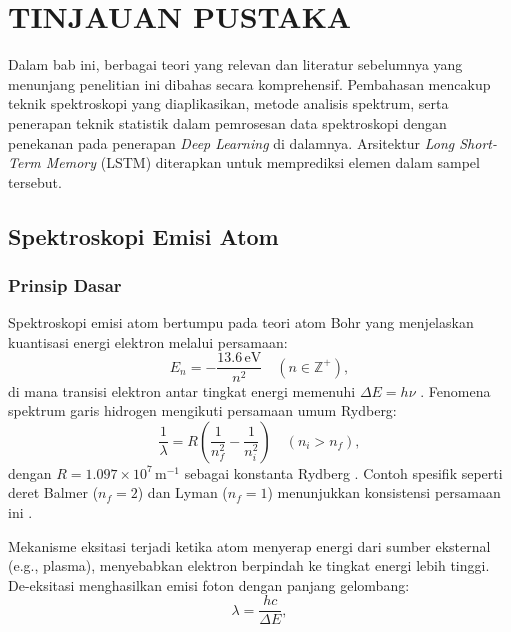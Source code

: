 


\chapter{TINJAUAN PUSTAKA}
\par Dalam bab ini, berbagai teori yang relevan dan literatur sebelumnya yang menunjang penelitian ini dibahas secara komprehensif. Pembahasan mencakup teknik spektroskopi yang diaplikasikan, metode analisis spektrum, serta penerapan teknik statistik dalam pemrosesan data spektroskopi dengan penekanan pada penerapan \textit{Deep Learning} di dalamnya. Arsitektur \textit{Long Short-Term Memory} (LSTM) diterapkan untuk memprediksi elemen dalam sampel tersebut.

\section{Spektroskopi Emisi Atom}
\subsection{Prinsip Dasar}
\label{subsec:prinsip-dasar}

Spektroskopi emisi atom bertumpu pada teori atom Bohr yang menjelaskan kuantisasi energi elektron melalui persamaan:
\begin{equation}
\label{eq:energi-bohr}
E_n = -\frac{13.6 \, \text{eV}}{n^2} \quad (n \in \mathbb{Z}^+),
\end{equation}
di mana transisi elektron antar tingkat energi memenuhi $\Delta E = h\nu$ \parencite{Beiser1992}. Fenomena spektrum garis hidrogen mengikuti persamaan umum Rydberg:
\begin{equation}
\label{eq:rydberg-umum}
\frac{1}{\lambda} = R \left( \frac{1}{n_f^2} - \frac{1}{n_i^2} \right) \quad (n_i > n_f),
\end{equation}
dengan $R = 1.097 \times 10^7 \, \text{m}^{-1}$ sebagai konstanta Rydberg \parencite{Beiser1992}. Contoh spesifik seperti deret Balmer ($n_f = 2$) dan Lyman ($n_f = 1$) menunjukkan konsistensi persamaan ini \parencite{Griffiths2005}.

Mekanisme eksitasi terjadi ketika atom menyerap energi dari sumber eksternal (e.g., plasma), menyebabkan elektron berpindah ke tingkat energi lebih tinggi. De-eksitasi menghasilkan emisi foton dengan panjang gelombang:
\begin{equation}
\label{eq:panjang-gelombang}
\lambda = \frac{hc}{\Delta E},
\end{equation}

